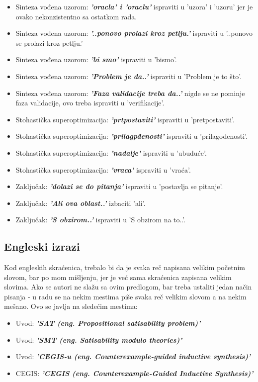\documentclass[a4paper]{report}
\begin{document}
\begin{itemize}
    \item Sinteza vođena uzorom: \textbf{\textit{'oracla' i 'oraclu'}} ispraviti u 'uzora' i 'uzoru' jer je ovako nekonzistentno sa ostatkom rada.
    \item Sinteza vođena uzorom: \textbf{\textit{'..ponovo prolazi kroz petlju.'}} ispraviti u '..ponovo se prolazi kroz petlju.' 
    \item Sinteza vođena uzorom: \textbf{\textit{'bi smo'}} ispraviti u 'bismo'.
    \item Sinteza vođena uzorom: \textbf{\textit{'Problem je da..'}} ispraviti u 'Problem je to što'.
    \item Sinteza vođena uzorom: \textbf{\textit{'Faza validacije treba da..'}} nigde se ne pominje faza validacije, ovo treba ispraviti u 'verifikacije'.
    \item Stohastička superoptimizacija: \textbf{\textit{'prtpostaviti'}} ispraviti u 'pretpostaviti'. 
    \item Stohastička superoptimizacija: \textbf{\textit{'prilagpđenosti'}} ispraviti u 'prilagođenosti'.
    \item Stohastička superoptimizacija: \textbf{\textit{'nadalje'}} ispraviti u 'ubuduće'.
    \item Stohastička superoptimizacija: \textbf{\textit{'vraca'}} ispraviti u 'vraća'.
    \item Zaključak: \textbf{\textit{'dolazi se do pitanja'}} ispraviti u 'postavlja se pitanje'.
    \item Zaključak: \textbf{\textit{'Ali ova oblast..'}} izbaciti 'ali'.
    \item Zaključak: \textbf{\textit{'S obzirom..'}} ispraviti u 'S obzirom na to..'.
\end{itemize}

\subsection{Engleski izrazi}
Kod engleskih skraćenica, trebalo bi da je svaka reč napisana velikim početnim slovom, bar po mom mišljenju, jer je već sama skraćenica zapisana velikim slovima. Ako se autori ne slažu sa ovim predlogom, bar treba ustaliti jedan način pisanja - u radu se na nekim mestima piše svaka reč velikim slovom a na nekim mešano. Ovo se javlja na sledećim mestima:

\begin{itemize}
	\item Uvod: \textbf{\textit{'SAT (eng. Propositional satisability problem)'}}
    \item Uvod: \textbf{\textit{'SMT (eng. Satisability modulo theories)'}}
	\item Uvod: \textbf{\textit{'CEGIS-u (eng. Counterexample-guided inductive synthesis)'}}
    \item CEGIS: \textbf{\textit{'CEGIS (eng. Counterexample-Guided Inductive Synthesis)'}}
\end{itemize}
\end{document}
